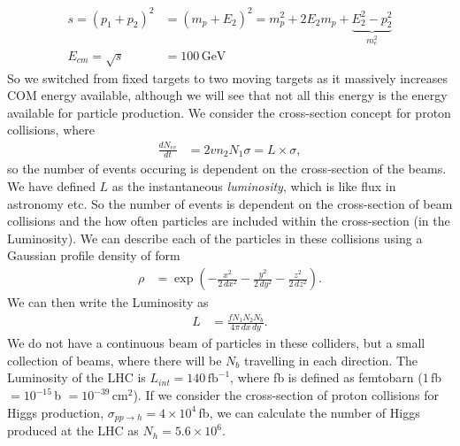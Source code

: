 \documentclass[relqm.tex]{subfiles}
\begin{document}
\begin{align}
    s = (p_1+p_2)^2 &= (m_p+E_2)^2 = m_p^2 + 2E_2m_p + \underbrace{E_2^2-p_2^2}_{m_e^2} \\
    E_{cm} = \sqrt{s} &= 100\,\text{GeV}
\end{align}
So we switched from fixed targets to two moving targets as it massively increases COM energy available, although we will see that not all this energy is the energy available for particle production. 
We consider the cross-section concept for proton collisions, where
\begin{align}
    \frac{dN_{ev}}{dt} &= 2vn_2N_1\sigma = L\times\sigma,
\end{align}
so the number of events occuring is dependent on the cross-section of the beams.
We have defined $L$ as the instantaneous \emph{luminosity}, which is like flux in astronomy etc. 
So the number of events is dependent on the cross-section of beam collisions and the how often particles are included within the cross-section (in the Luminosity).
We can describe each of the particles in these collisions using a Gaussian profile density of form
\begin{align}
    \rho &= \exp\left(-\frac{x^2}{2\,dx^2}-\frac{y^2}{2\,dy^2}-\frac{z^2}{2\,dz^2}\right).
\end{align}
We can then write the Luminosity as
\begin{align}
    L &= \frac{fN_1N_2N_b}{4\pi\,dx\,dy}.
\end{align}
We do not have a continuous beam of particles in these colliders, but a small collection of beams, where there will be $N_b$ travelling in each direction.
The Luminosity of the LHC is $L_{int}=140\,\text{fb}^{-1}$, where fb is defined as femtobarn ($1\,$fb $=10^{-15}\,$b $=10^{-39}\,$cm$^2$).
If we consider the cross-section of proton collisions for Higgs production, $\sigma_{pp\to h}=4\times10^4\,$fb, we can calculate the number of Higgs produced at the LHC as $N_{h}=5.6\times10^6$.
\end{document}
